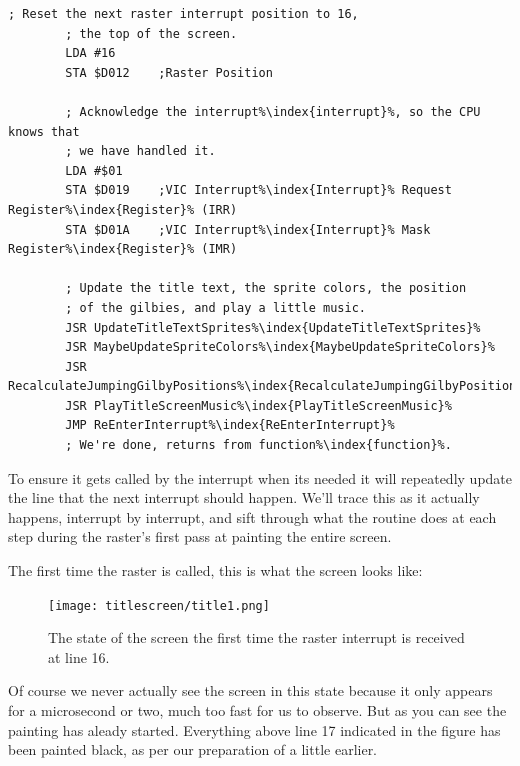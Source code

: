 \begin{lstlisting}[caption=\icode{TitleScreenAnimation\index{TitleScreenAnimation}} responsible for choosing what to do at each interrupt\index{interrupt}. ,escapechar=\%]
        ; Reset the next raster interrupt position to 16,
        ; the top of the screen.
        LDA #16
        STA $D012    ;Raster Position

        ; Acknowledge the interrupt%\index{interrupt}%, so the CPU knows that
        ; we have handled it.
        LDA #$01
        STA $D019    ;VIC Interrupt%\index{Interrupt}% Request Register%\index{Register}% (IRR)
        STA $D01A    ;VIC Interrupt%\index{Interrupt}% Mask Register%\index{Register}% (IMR)

        ; Update the title text, the sprite colors, the position 
        ; of the gilbies, and play a little music.
        JSR UpdateTitleTextSprites%\index{UpdateTitleTextSprites}%
        JSR MaybeUpdateSpriteColors%\index{MaybeUpdateSpriteColors}%
        JSR RecalculateJumpingGilbyPositions%\index{RecalculateJumpingGilbyPositions}%
        JSR PlayTitleScreenMusic%\index{PlayTitleScreenMusic}%
        JMP ReEnterInterrupt%\index{ReEnterInterrupt}%
        ; We're done, returns from function%\index{function}%.
\end{lstlisting}

To ensure it gets called by the interrupt when its needed it will repeatedly update the line that the next interrupt
should happen. We'll trace this as it actually happens, interrupt by interrupt, and sift through what the routine
does at each step during the raster's first pass at painting the entire screen.

The first time the raster is called, this is what the screen looks like:

\begin{figure}[H]
    \centering
      \texttt{[image: titlescreen/title1.png]}%
\caption{The state of the screen the first time the raster interrupt is received at line 16.}
\end{figure}

Of course we never actually see the screen in this state because it only appears for a microsecond or two, much too
fast for us to observe. But as you can see the painting has aleady started. Everything above line 17 indicated in 
the figure has been painted black, as per our preparation of  a little earlier.

